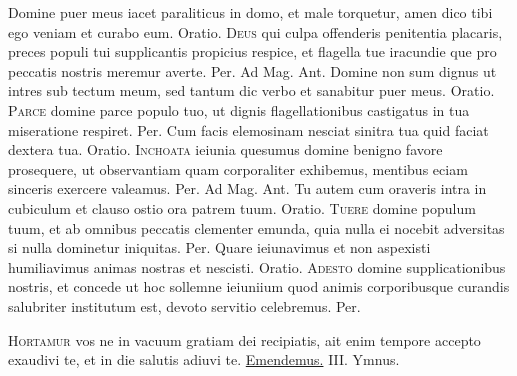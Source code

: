 \begin{multicols*}{2}
 Domine puer meus iacet paraliticus in domo, et male torquetur, amen dico tibi ego veniam et curabo eum. {\color{Red} Oratio.}
\lettrine[lines=2]{\zallmancaps \color{Blue} D}{eus} qui culpa offenderis penitentia placaris, preces populi tui supplicantis propicius respice, et flagella tue iracundie que pro peccatis nostris meremur averte. Per. {\color{Red} Ad Mag. Ant.} Domine non sum dignus ut intres sub tectum meum, sed tantum dic verbo et sanabitur puer meus. {\color{Red} Oratio.}
\lettrine[lines=2]{\zallmancaps \color{Red} P}{arce} domine parce populo tuo, ut dignis flagellationibus castigatus in tua miseratione respiret. Per.
 Cum facis elemosinam nesciat sinitra tua quid faciat dextera tua. {\color{Red} Oratio.}
\lettrine[lines=2]{\zallmancaps \color{Blue} I}{nchoata} ieiunia quesumus domine benigno favore prosequere, ut observantiam quam corporaliter exhibemus, mentibus eciam sinceris exercere valeamus. Per. {\color{Red} Ad Mag. Ant.} Tu autem cum oraveris intra in cubiculum et clauso ostio ora patrem tuum. {\color{Red} Oratio.}
\lettrine[lines=2]{\zallmancaps \color{Blue} T}{uere} domine populum tuum, et ab omnibus peccatis clementer emunda, quia nulla ei nocebit adversitas si nulla dominetur iniquitas. Per.
 Quare ieiunavimus et non aspexisti humiliavimus animas nostras et nescisti. {\color{Red} Oratio.}
\lettrine[lines=2]{\zallmancaps \color{Blue} A}{desto} domine supplicationibus nostris, et concede ut hoc sollemne ieiuniium quod animis corporibusque curandis salubriter institutum est, devoto servitio celebremus. Per.
{\color{Red} }
\par {}
\lettrine[lines=2]{\zallmancaps \color{Red} H}{ortamur} \hypertarget{hortamur-vos}{\label{hortamur-vos}} vos ne in vacuum gratiam dei recipiatis, ait enim tempore accepto exaudivi te, et in die salutis adiuvi te. \R \hyperlink{emendemus-in-melius}{Emendemus.} {\color{Red} III. Ymnus.}
\end{multicols*}
